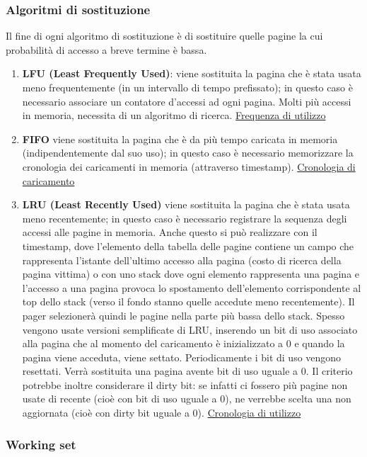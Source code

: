 \documentclass{article}
\begin{document}
\subsubsection{Algoritmi di sostituzione}
\noindent Il fine di ogni algoritmo di sostituzione è di sostituire quelle pagine la cui probabilità di accesso a breve termine è bassa.
\begin{enumerate}
    \item \textbf{LFU (Least Frequently Used)}: viene sostituita la pagina che è stata usata meno frequentemente (in un intervallo di tempo
    prefissato); in questo caso è necessario associare un contatore d'accessi ad ogni pagina. Molti più accessi in memoria, necessita 
    di un algoritmo di ricerca. \underline{Frequenza di utilizzo}
    \item \textbf{FIFO} viene sostituita la pagina che è da più tempo caricata in memoria (indipendentemente dal suo uso); in questo caso
    è necessario memorizzare la cronologia dei caricamenti in memoria (attraverso timestamp). \underline{Cronologia di caricamento}
    \item \textbf{LRU (Least Recently Used)} viene sostituita la pagina che è stata usata meno recentemente; in questo caso è necessario
    registrare la sequenza degli accessi alle pagine in memoria. Anche questo si può realizzare con il timestamp, dove l'elemento della tabella
    delle pagine contiene un campo che rappresenta l'istante dell'ultimo accesso alla pagina (costo di ricerca della pagina vittima) o con uno 
    stack dove ogni elemento rappresenta una pagina e l'accesso a una pagina provoca lo spostamento dell'elemento corrispondente al top dello
    stack (verso il fondo stanno quelle accedute meno recentemente). Il pager selezionerà quindi le pagine nella parte più bassa dello stack.
    Spesso vengono usate versioni semplificate di LRU, inserendo un bit di uso associato alla pagina che al momento del caricamento è
    inizializzato a 0 e quando la pagina viene acceduta, viene settato. Periodicamente i bit di uso vengono resettati. Verrà sostituita una
    pagina avente bit di uso uguale a 0. Il criterio potrebbe inoltre considerare il dirty bit: se infatti ci fossero più pagine 
    non usate di recente (cioè con bit di uso uguale a 0), ne verrebbe scelta una non aggiornata (cioè con dirty bit uguale a 0).
    \underline{Cronologia di utilizzo}
\end{enumerate}


\subsubsection{Working set}
\end{document}
